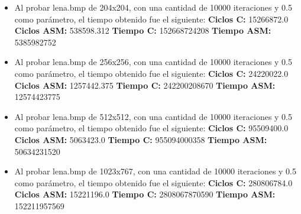\documentclass[10pt, a4paper]{article}
\begin{document}
\begin{itemize}
\begin{itemize}
\item{Al probar lena.bmp de 204x204, con una cantidad de 10000 iteraciones y 0.5 como parámetro, el tiempo obtenido fue el siguiente:\newline
\newline
\textbf{Ciclos C:}                 15266872.0\newline
\vspace{0.15cm}
\textbf{Ciclos ASM:}               538598.312\newline
\textbf{Tiempo C:}                 152668724208\newline
\textbf{Tiempo ASM:}               5385982752\newline}

\item{Al probar lena.bmp de 256x256, con una cantidad de 10000 iteraciones y 0.5 como parámetro, el tiempo obtenido fue el siguiente:\newline
\newline
\textbf{Ciclos C:}                 24220022.0\newline
\vspace{0.15cm}
\textbf{Ciclos ASM:}               1257442.375\newline
\textbf{Tiempo C:}                 242200208670\newline
\textbf{Tiempo ASM:}               12574423775\newline}

\item{Al probar lena.bmp de 512x512, con una cantidad de 10000 iteraciones y 0.5 como parámetro, el tiempo obtenido fue el siguiente:\newline
\newline
\textbf{Ciclos C:}                 95509400.0\newline
\vspace{0.15cm}
\textbf{Ciclos ASM:}               5063423.0\newline
\textbf{Tiempo C:}                 955094000358\newline
\textbf{Tiempo ASM:}               50634231520\newline}

\item{Al probar lena.bmp de 1023x767, con una cantidad de 10000 iteraciones y 0.5 como parámetro, el tiempo obtenido fue el siguiente:\newline
\newline
\textbf{Ciclos C:}                 280806784.0\newline
\vspace{0.15cm}
\textbf{Ciclos ASM:}               15221196.0\newline
\textbf{Tiempo C:}                 2808067870590\newline
\textbf{Tiempo ASM:}               152211957569\newline}


\end{itemize}
\end{itemize}
\end{document}
